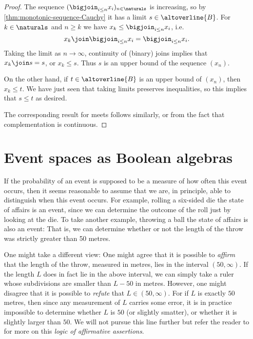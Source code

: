 \documentclass[article, a4paper, 11pt, oneside]{memoir}
\numberwithin{equation}{chapter}
\begin{document}
\begin{proof}
    The sequence $( \bigjoin_{i \leq n} x_i )_{n\in\naturals}$ is increasing, so by \cref{thm:monotonic-sequence-Cauchy} it has a limit $s \in \altoverline{B}$. For $k \in \naturals$ and $n \geq k$ we have $x_k \leq \bigjoin_{i \leq n} x_i$, i.e.
    \begin{equation*}
        x_k \join \bigjoin_{i \leq n} x_i
            = \bigjoin_{i \leq n} x_i.
    \end{equation*}
    Taking the limit as $n \to \infty$, continuity of (binary) joins implies that $x_k \join s = s$, or $x_k \leq s$. Thus $s$ is an upper bound of the sequence $(x_n)$.

    On the other hand, if $t \in \altoverline{B}$ is an upper bound of $(x_n)$, then $x_k \leq t$. We have just seen that taking limits preserves inequalities, so this implies that $s \leq t$ as desired.

    The corresponding result for meets follows similarly, or from the fact that complementation is continuous.
\end{proof}


\chapter{Event spaces as Boolean algebras}

If the probability of an event is supposed to be a measure of how often this event occurs, then it seems reasonable to assume that we are, in principle, able to distinguish when this event occurs. For example, rolling a six-sided die the state of affairs  is an event, since we can determine the outcome of the roll just by looking at the die. To take another example, throwing a ball the state of affairs  is also an event: That is, we can determine whether or not the length of the throw was strictly greater than 50 metres.

One might take a different view: One might agree that it is possible to \emph{affirm} that the length of the throw, measured in metres, lies in the interval $(50,\infty)$. If the length $L$ does in fact lie in the above interval, we can simply take a ruler whose subdivisions are smaller than $L - 50$ in metres. However, one might disagree that it is possible to \emph{refute} that $L \in (50, \infty)$. For if $L$ is exactly $50$ metres, then since any measurement of $L$ carries some error, it is in practice impossible to determine whether $L$ is $50$ (or slightly smatter), or whether it is slightly larger than $50$. We will not pursue this line further but refer the reader to \textcite{vickers1989} for more on this \emph{logic of affirmative assertions}.
\end{document}
